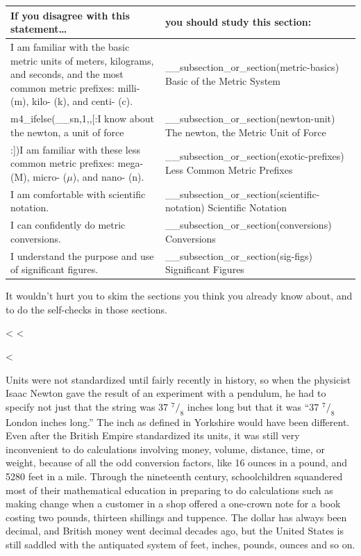 \noindent\begin{tabular}{|p{60mm}|p{60mm}|}
\hline
\textbf{If you disagree with this statement\ldots} & \textbf{you should study this section:}\\
\hline
I am familiar with the basic metric units of meters, kilograms, and seconds, and the most
common metric prefixes: milli- (m), kilo- (k), and centi- (c). & __subsection_or_section(metric-basics) Basic of the Metric System \\
\hline
m4_ifelse(__sn,1,,[:I know about the newton, a unit of force & __subsection_or_section(newton-unit) The newton, the Metric Unit of Force\\
\hline
:])I am familiar with these less common metric prefixes: mega- (M), micro- ($\mu$), and nano- (n). &
__subsection_or_section(exotic-prefixes) Less Common Metric Prefixes \\
\hline
I am comfortable with scientific notation. & __subsection_or_section(scientific-notation) Scientific Notation \\
\hline
I can confidently do metric conversions. & __subsection_or_section(conversions) Conversions \\
\hline
I understand the purpose and use of significant figures. & __subsection_or_section(sig-figs) Significant Figures \\
\hline
\end{tabular}

\noindent It wouldn't hurt you to skim the sections you think you
already know about, and to do the self-checks in those sections.

<%
<%

<%

Units were not standardized until fairly recently in
history, so when the physicist Isaac
Newton gave the result of an experiment with a pendulum, he
had to specify not just that the string was 37  $^7/_8$
inches long but that it was ``37  $^7/_8$ London inches
long.'' The inch as defined in Yorkshire would have been
different. Even after the British Empire standardized its
units, it was still very inconvenient to do calculations
involving money, volume, distance, time, or weight, because
of all the odd conversion factors, like 16 ounces in a
pound, and 5280 feet in a mile. Through the nineteenth
century, schoolchildren squandered most of their mathematical
education in preparing to do calculations such as making
change when a customer in a shop offered a one-crown note
for a book costing two pounds, thirteen shillings and
tuppence. The dollar has always been decimal, and British
money went decimal decades ago, but the United States is
still saddled with the antiquated system of feet, inches,
pounds, ounces and so on.

